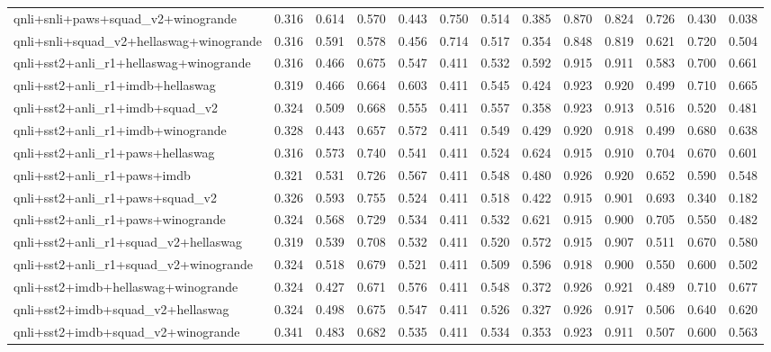 \begin{table}[t]
\begin{tabular}{lrrrrrrrrrrrr}
    qnli+snli+paws+squad\_v2+winogrande & 0.316 & 0.614 & 0.570 & 0.443 & 0.750 & 0.514 & 0.385 & 0.870 & 0.824 & 0.726 & 0.430 & 0.038 \\
    qnli+snli+squad\_v2+hellaswag+winogrande & 0.316 & 0.591 & 0.578 & 0.456 & 0.714 & 0.517 & 0.354 & 0.848 & 0.819 & 0.621 & 0.720 & 0.504 \\
    qnli+sst2+anli\_r1+hellaswag+winogrande & 0.316 & 0.466 & 0.675 & 0.547 & 0.411 & 0.532 & 0.592 & 0.915 & 0.911 & 0.583 & 0.700 & 0.661 \\
    qnli+sst2+anli\_r1+imdb+hellaswag & 0.319 & 0.466 & 0.664 & 0.603 & 0.411 & 0.545 & 0.424 & 0.923 & 0.920 & 0.499 & 0.710 & 0.665 \\
    qnli+sst2+anli\_r1+imdb+squad\_v2 & 0.324 & 0.509 & 0.668 & 0.555 & 0.411 & 0.557 & 0.358 & 0.923 & 0.913 & 0.516 & 0.520 & 0.481 \\
    qnli+sst2+anli\_r1+imdb+winogrande & 0.328 & 0.443 & 0.657 & 0.572 & 0.411 & 0.549 & 0.429 & 0.920 & 0.918 & 0.499 & 0.680 & 0.638 \\
    qnli+sst2+anli\_r1+paws+hellaswag & 0.316 & 0.573 & 0.740 & 0.541 & 0.411 & 0.524 & 0.624 & 0.915 & 0.910 & 0.704 & 0.670 & 0.601 \\
    qnli+sst2+anli\_r1+paws+imdb & 0.321 & 0.531 & 0.726 & 0.567 & 0.411 & 0.548 & 0.480 & 0.926 & 0.920 & 0.652 & 0.590 & 0.548 \\
    qnli+sst2+anli\_r1+paws+squad\_v2 & 0.326 & 0.593 & 0.755 & 0.524 & 0.411 & 0.518 & 0.422 & 0.915 & 0.901 & 0.693 & 0.340 & 0.182 \\
    qnli+sst2+anli\_r1+paws+winogrande & 0.324 & 0.568 & 0.729 & 0.534 & 0.411 & 0.532 & 0.621 & 0.915 & 0.900 & 0.705 & 0.550 & 0.482 \\
    qnli+sst2+anli\_r1+squad\_v2+hellaswag & 0.319 & 0.539 & 0.708 & 0.532 & 0.411 & 0.520 & 0.572 & 0.915 & 0.907 & 0.511 & 0.670 & 0.580 \\
    qnli+sst2+anli\_r1+squad\_v2+winogrande & 0.324 & 0.518 & 0.679 & 0.521 & 0.411 & 0.509 & 0.596 & 0.918 & 0.900 & 0.550 & 0.600 & 0.502 \\
    qnli+sst2+imdb+hellaswag+winogrande & 0.324 & 0.427 & 0.671 & 0.576 & 0.411 & 0.548 & 0.372 & 0.926 & 0.921 & 0.489 & 0.710 & 0.677 \\
    qnli+sst2+imdb+squad\_v2+hellaswag & 0.324 & 0.498 & 0.675 & 0.547 & 0.411 & 0.526 & 0.327 & 0.926 & 0.917 & 0.506 & 0.640 & 0.620 \\
    qnli+sst2+imdb+squad\_v2+winogrande & 0.341 & 0.483 & 0.682 & 0.535 & 0.411 & 0.534 & 0.353 & 0.923 & 0.911 & 0.507 & 0.600 & 0.563 \\

\end{tabular}
\end{table}
